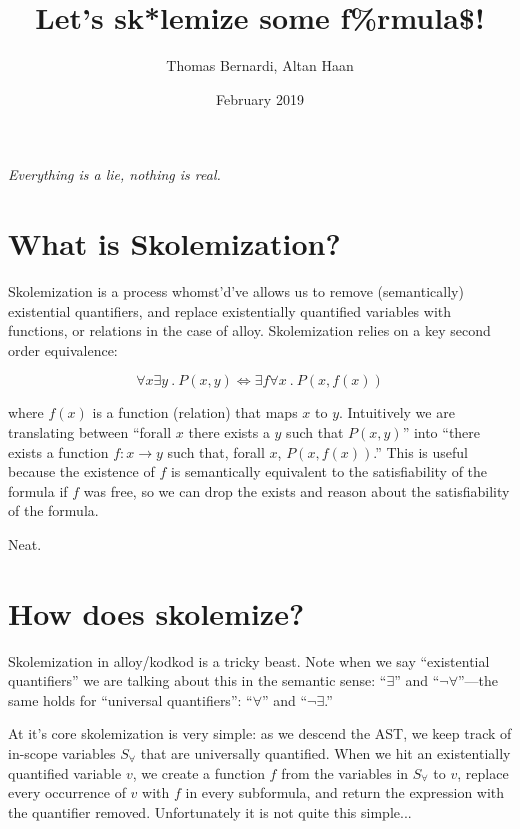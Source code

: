 \documentclass{article}
\title{Let's sk*lemize some f\%rmula\$!}
\date{February 2019}
\author{Thomas Bernardi, Altan Haan}
\theoremstyle{definition}
\begin{document}
	\maketitle
	\begin{center}	
		\textit{Everything is a lie, nothing is real.} \\
    \end{center}

    \section{What is Skolemization?}

    Skolemization is a process whomst'd've allows us to remove (semantically) existential quantifiers, and replace existentially quantified variables with functions, or relations in the case of alloy. Skolemization relies on a key second order equivalence:

    $$\forall x \exists y~.~P(x, y) \Leftrightarrow \exists f \forall x~.~P(x, f(x))$$

    where $f(x)$ is a function (relation) that maps $x$ to $y$. Intuitively we are translating between ``forall $x$ there exists a $y$ such that $P(x, y)$'' into ``there exists a function $f : x \rightarrow y$ such that, forall $x$, $P(x, f(x))$.'' This is useful because the existence of $f$ is semantically equivalent to the satisfiability of the formula if $f$ was free, so we can drop the exists and reason about the satisfiability of the formula.

    Neat.

    \section{How does skolemize?}

    Skolemization in alloy/kodkod is a tricky beast. Note when we say ``existential quantifiers'' we are talking about this in the semantic sense: ``$\exists$'' and ``$\neg\forall$''---the same holds for ``universal quantifiers'': ``$\forall$'' and ``$\neg \exists$.''

    At it's core skolemization is very simple: as we descend the AST, we keep track of in-scope variables $S_\forall$ that are universally quantified. When we hit an existentially quantified variable $v$, we create a function $f$ from the variables in $S_\forall$ to $v$, replace every occurrence of $v$ with $f$ in every subformula, and return the expression with the quantifier removed. Unfortunately it is not quite this simple...
\end{document}

